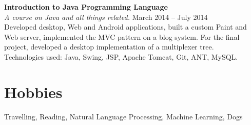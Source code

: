 \documentclass[margin,line]{resume}
\begin{document}
\begin{resume}
\textbf{Introduction to Java Programming Language} \vspace{2mm}\\\vspace{1mm}%
\textsl{A course on Java and all things related.} \hfill March 2014 -- July 2014\\%
Developed desktop, Web and Android applications, built a custom Paint and Web server, implemented the MVC pattern on a blog system. For the final project, developed a desktop implementation of a multiplexer tree. \\
Technologies used: Java, Swing, JSP, Apache Tomcat, Git, ANT, MySQL.
\vspace{2mm}
\section{\mysidestyle Hobbies}


Travelling, Reading, Natural Language Processing, Machine Learning, Dogs

\end{resume}
\end{document}
